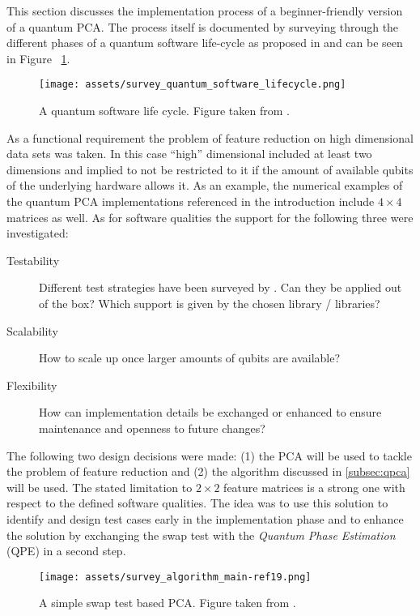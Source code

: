 \noindent
This section discusses the implementation process of a beginner-friendly version of a quantum PCA. The process itself is documented by surveying through the different phases of a quantum software life-cycle as proposed in \cite[pp. 9-10]{Zhao_2020} and can be seen in Figure ~\ref{fig:lifecycle}.

\begin{figure}
  \centering
  \texttt{[image: assets/survey\_quantum\_software\_lifecycle.png]}
  \caption{A quantum software life cycle. Figure taken from \cite{Zhao_2020}.}
  \label{fig:lifecycle}
\end{figure}

As a functional requirement the problem of feature reduction on high dimensional data sets was taken. In this case \enquote{high} dimensional included at least two dimensions and implied to not be restricted to it if the amount of available qubits of the underlying hardware allows it. As an example, the numerical examples of the quantum PCA implementations referenced in the introduction include $4 \times 4$ matrices as well. As for software qualities the support for the following three were investigated:
\begin{description}
  \item [Testability] Different test strategies have been surveyed by \cite[pp. 12-17]{Zhao_2020}. Can they be applied out of the box? Which support is given by the chosen library / libraries?
  \item [Scalability] How to scale up once larger amounts of qubits are available?
  \item [Flexibility] How can implementation details be exchanged or enhanced to ensure maintenance and openness to future changes?
\end{description}

The following two design decisions were made: (1) the PCA will be used to tackle the problem of feature reduction and (2) the algorithm discussed in \ref{subsec:qpca} will be used. The stated limitation to $2 \times 2$ feature matrices is a strong one with respect to the defined software qualities. The idea was to use this solution to identify and design test cases early in the implementation phase and to enhance the solution by exchanging the swap test with the \emph{Quantum Phase Estimation} (QPE) in a second step.

\begin{figure}
  \centering
  \texttt{[image: assets/survey\_algorithm\_main-ref19.png]}
  \caption{A simple swap test based PCA. Figure taken from \cite{Lokho_2020}.}
  \label{fig:mainref19}
\end{figure}

